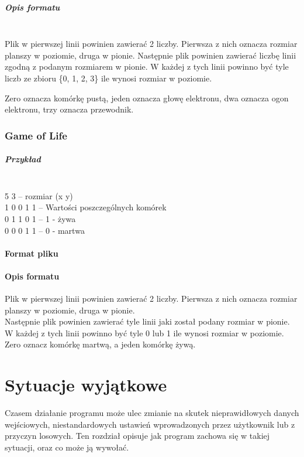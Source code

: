 \documentclass{report}
\begin{document}
\paragraph{Opis formatu}\mbox{}\\
Plik w pierwszej linii powinien zawierać 2 liczby. Pierwsza z nich oznacza rozmiar planszy w poziomie, druga w pionie.
Następnie plik powinien zawierać liczbę linii zgodną z podanym rozmiarem w pionie. W każdej z tych linii powinno być tyle liczb ze zbioru \{0, 1, 2, 3\} ile wynosi rozmiar w poziomie.

Zero oznacza komórkę pustą, jeden oznacza głowę elektronu, dwa oznacza ogon elektronu, trzy oznacza przewodnik.

\subsection{Game of Life}

\paragraph{Przykład} \mbox{} \\
5 3 \tab -- rozmiar (x y) \\
1 0 0 1 1 \tab -- Wartości poszczególnych komórek \\
0 1 1 0 1 \tab -- 1 - żywa \\
0 0 0 1 1 \tab -- 0 - martwa \\

\subsubsection{Format pliku}

\subsubsection*{Opis formatu}
Plik w pierwszej linii powinien zawierać 2 liczby. Pierwsza z nich oznacza rozmiar planszy w poziomie, druga w pionie. \\
Następnie plik powinien zawierać tyle linii jaki został podany rozmiar w pionie. W każdej z tych linii powinno być tyle 0 lub 1 ile wynosi rozmiar w poziomie. \\
Zero oznacz komórkę martwą, a jeden komórkę żywą.

\chapter{Sytuacje wyjątkowe}
Czasem działanie programu może ulec zmianie na skutek nieprawidłowych danych wejściowych, niestandardowych ustawień wprowadzonych przez użytkownik lub z przyczyn losowych. Ten rozdział opisuje jak program zachowa się w takiej sytuacji, oraz co może ją wywołać.
\end{document}

